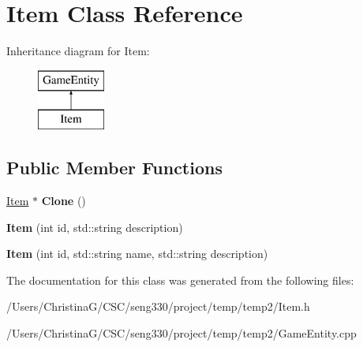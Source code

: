 \hypertarget{class_item}{}\section{Item Class Reference}
\label{class_item}
Inheritance diagram for Item\+:\begin{figure}[H]
\begin{center}
\leavevmode
\includegraphics[height=2.000000cm]{class_item}
\end{center}
\end{figure}
\subsection*{Public Member Functions}
\begin{DoxyCompactItemize}
\item 
\hypertarget{class_item_a5ff2353dcd5cb6808c7cc101bc07cef3}{}\hyperlink{class_item}{Item} $\ast$ {\bfseries Clone} ()\label{class_item_a5ff2353dcd5cb6808c7cc101bc07cef3}

\item 
\hypertarget{class_item_a1de089cb4e92ab58a297c442c69109be}{}{\bfseries Item} (int id, std\+::string description)\label{class_item_a1de089cb4e92ab58a297c442c69109be}

\item 
\hypertarget{class_item_a7fc39ba8739faa4ea1bd60f1863f770b}{}{\bfseries Item} (int id, std\+::string name, std\+::string description)\label{class_item_a7fc39ba8739faa4ea1bd60f1863f770b}

\end{DoxyCompactItemize}


The documentation for this class was generated from the following files\+:\begin{DoxyCompactItemize}
\item 
/\+Users/\+Christina\+G/\+C\+S\+C/seng330/project/temp/temp2/Item.\+h\item 
/\+Users/\+Christina\+G/\+C\+S\+C/seng330/project/temp/temp2/Game\+Entity.\+cpp\end{DoxyCompactItemize}
